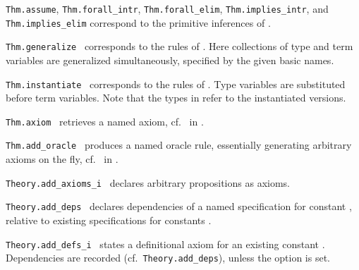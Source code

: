 \begin{isabellebody}
\begin{isamarkuptext}
\begin{description}
  \item \verb|Thm.assume|, \verb|Thm.forall_intr|, \verb|Thm.forall_elim|, \verb|Thm.implies_intr|, and \verb|Thm.implies_elim|
  correspond to the primitive inferences of .

  \item \verb|Thm.generalize|~
  corresponds to the  rules of
  .  Here collections of type and term
  variables are generalized simultaneously, specified by the given
  basic names.

  \item \verb|Thm.instantiate|~ corresponds to the  rules
  of .  Type variables are substituted before
  term variables.  Note that the types in 
  refer to the instantiated versions.

  \item \verb|Thm.axiom|~ retrieves a named
  axiom, cf.\  in .

  \item \verb|Thm.add_oracle|~ produces a named
  oracle rule, essentially generating arbitrary axioms on the fly,
  cf.\  in .

  \item \verb|Theory.add_axioms_i|~ declares
  arbitrary propositions as axioms.

  \item \verb|Theory.add_deps|~ declares dependencies of a named specification
  for constant , relative to existing
  specifications for constants .

  \item \verb|Theory.add_defs_i|~ states a definitional axiom for an existing
  constant .  Dependencies are recorded (cf.\ \verb|Theory.add_deps|), unless the  option is set.


\end{description}
\end{isamarkuptext}
\end{isabellebody}

